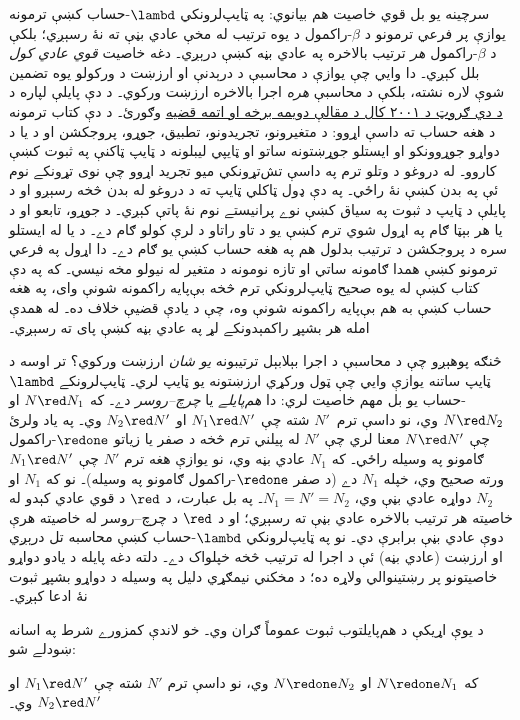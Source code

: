 \documentclass[../../../include/open-logic-section]{subfiles}
\begin{document}
سرچينه يو بل قوي خاصيت هم بيانوي: په ټايپ‌لرونکي
$\lambd$-حساب کښې ترمونه يوازې پر فرعي ترمونو د
$\beta$-راکمول د يوه ترتيب له مخې عادي بڼې ته نۀ رسېږي؛
بلکې د $\beta$-راکمول \emph{هر} ترتيب بالاخره په عادي
بڼه کښې درېږي۔ دغه خاصيت \emph{قوي عادي کول} بلل کېږي۔
دا وايي چې يوازې د محاسبې د درېدنې او ارزښت د ورکولو
يوه تضمين شوې لاره نشته، بلکې د محاسبې \emph{هره}
اجرا بالاخره ارزښت ورکوي۔ د دې پايلې لپاره د
\href{https://members.loria.fr/PdeGroote/papers/tlca01.pdf}{د دي ګروټ د ۲۰۰۱ کال د مقالې دويمه برخه او اتمه قضيه} وګورئ۔
د دې کتاب ترمونه د هغه حساب ته داسې اړوو: د متغيرونو،
تجريدونو، تطبيق، جوړو، پروجکشن او د يا د دواړو جوړوونکو
او ايستلو جوړښتونه ساتو او ټايپي ليبلونه د ټايپ ټاکنې
په ثبوت کښې کاروو۔ له دروغو د وتلو ترم په داسې تش‌تړونکي
ميو تجريد اړوو چې نوی تړونکے نوم ئې په بدن کښې نۀ راځي۔
په دې ډول ټاکلي ټايپ ته د دروغو له بدن څخه رسېږو او د
پايلې د ټايپ د ثبوت په سياق کښې نوے پرانيستے نوم نۀ پاتې
کېږي۔ د جوړو، تابعو او د يا هر بېټا ګام په اړول شوي ترم
کښې يو د تاو راتاو د لرې کولو ګام دے۔ د يا له ايستلو سره
د پروجکشن د ترتيب بدلول هم په هغه حساب کښې يو ګام دے۔
دا اړول په فرعي ترمونو کښې همدا ګامونه ساتي او تازه نومونه
د متغير له نيولو مخه نيسي۔ که په دې کتاب کښې له يوه
صحيح ټايپ‌لرونکي ترم څخه بې‌پايه راکمونه شونې وای، په
هغه حساب کښې به هم بې‌پايه راکمونه شونې وه، چې د يادې
قضيې خلاف ده۔ له همدې امله هر بشپړ راکمېدونکے لړ په
عادي بڼه کښې پای ته رسېږي۔

څنګه پوهېږو چې د محاسبې د اجرا بېلابېل ترتيبونه
\emph{يو شان} ارزښت ورکوي؟ تر اوسه د ټايپ ساتنه يوازې
وايي چې ټول ورکړي ارزښتونه يو ټايپ لري۔ ټايپ‌لرونکے
$\lambd$-حساب يو بل مهم خاصيت لري: دا \emph{هم‌پايلے}
يا \emph{چرچ--روسر} دے۔ که $N \red N_1$ او $N \red N_2$
وي، نو داسې ترم~$N'$ شته چې $N_1 \red N'$ او $N_2 \red N'$
وي۔ په ياد ولرئ چې $N \red N'$ معنا لري چې $N'$ له پيلني ترم
څخه د صفر يا زياتو $\redone$-راکمول ګامونو په وسيله راځي۔
که $N_1$ عادي بڼه وي، نو يوازې هغه ترم $N'$ چې
$N_1 \red N'$ ورته صحيح وي، خپله $N_1$ دے (د صفر
$\redone$-راکمول ګامونو په وسيله)۔ نو که $N_1$ او $N_2$
دواړه عادي بڼې وي، $N_1 = N' = N_2$۔ په بل عبارت،
د $\red$ د قوي عادي کېدو له خاصيته هر ترتيب بالاخره
عادي بڼې ته رسېږي؛ او د $\red$ د چرچ--روسر له خاصيته
هرې دوې عادي بڼې برابرې دي۔ نو په ټايپ‌لرونکي
$\lambd$-حساب کښې محاسبه تل درېږي او ارزښت (عادي بڼه)
ئې د اجرا له ترتيب څخه خپلواک دے۔ دلته دغه پايله د
يادو دواړو خاصيتونو پر رښتينوالي ولاړه ده؛ د مخکني
نيمګړي دليل په وسيله د دواړو بشپړ ثبوت نۀ ادعا کېږي۔

د يوې اړيکې د هم‌پايلتوب ثبوت عموماً ګران وي۔ خو
لاندې کمزورے شرط په اسانه ښودلے شو:

\begin{prop}
که $N \redone N_1$ او $N \redone N_2$ وي، نو داسې ترم
$N'$ شته چې $N_1 \red N'$ او $N_2 \red N'$ وي۔
\end{prop}
\end{document}
